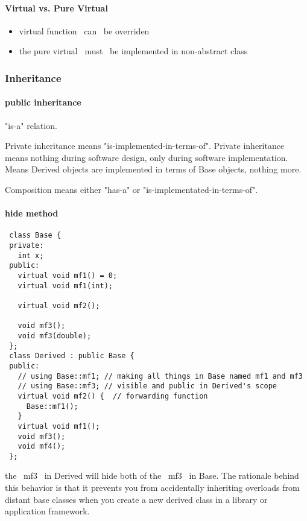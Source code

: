 \paragraph{Virtual vs. Pure Virtual}
\begin{itemize}
\item virtual function ~can~ be overriden
\item the pure virtual ~must~ be implemented in non-abstract class
\end{itemize}

\subsubsection{Inheritance}

\paragraph{public inheritance}
"is-a" relation.

Private inheritance means "is-implemented-in-terms-of".  Private
inheritance means nothing during software design, only during software
implementation.  Means Derived objects are implemented in terms of
Base objects, nothing more.

Composition means either "has-a" or "is-implementated-in-terms-of".

\paragraph{hide method}

\begin{lstlisting}
 class Base {
 private:
   int x;
 public:
   virtual void mf1() = 0;
   virtual void mf1(int);

   virtual void mf2();

   void mf3();
   void mf3(double);
 };
 class Derived : public Base {
 public:
   // using Base::mf1; // making all things in Base named mf1 and mf3
   // using Base::mf3; // visible and public in Derived's scope
   virtual void mf2() {  // forwarding function
     Base::mf1();
   }
   virtual void mf1();
   void mf3();
   void mf4();
 };
\end{lstlisting}

the ~mf3~ in Derived will hide both of the ~mf3~ in Base.  The
rationale behind this behavior is that it prevents you from
accidentally inheriting overloads from distant base classes when you
create a new derived class in a library or application framework.

